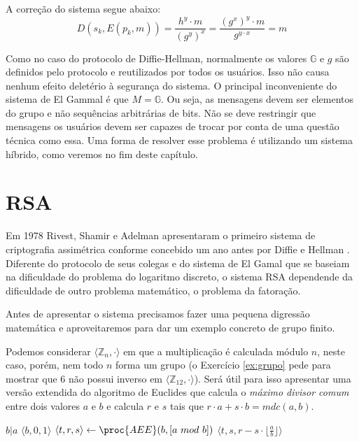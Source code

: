 A correção do sistema segue abaixo:
\begin{displaymath}
  D(s_k, E(p_k, m)) =  \frac{h^y \cdot m}{(g^y)^x} = \frac{(g^x)^y \cdot m}{g^{y \cdot x}} = m 
\end{displaymath}

Como no caso do protocolo de Diffie-Hellman, normalmente os valores $\mathbb{G}$ e $g$ são definidos pelo protocolo e reutilizados por todos os usuários.
Isso não causa nenhum efeito deletério à segurança do sistema.
O principal inconveniente do sistema de El Gammal é que $M = \mathbb{G}$.
Ou seja, as mensagens devem ser elementos do grupo e não sequências arbitrárias de bits.
Não se deve restringir que mensagens os usuários devem ser capazes de trocar por conta de uma questão técnica como essa.
Uma forma de resolver esse problema é utilizando um sistema híbrido, como veremos no fim deste capítulo.


\section{RSA}
\label{sec:rsa}

Em 1978 Rivest, Shamir e Adelman apresentaram o primeiro sistema de criptografia assimétrica conforme concebido um ano antes por Diffie e Hellman \cite{Rivest78}.
Diferente do protocolo de seus colegas e do sistema de El Gamal que se baseiam na dificuldade do problema do logaritmo discreto, o sistema RSA dependende da dificuldade de outro problema matemático, o problema da fatoração.

Antes de apresentar o sistema precisamos fazer uma pequena digressão matemática e aproveitaremos para dar um exemplo concreto de grupo finito.

Podemos considerar $\langle \mathbb{Z}_n, \cdot \rangle$ em que a multiplicação é calculada módulo $n$, neste caso, porém, nem todo $n$ forma um grupo (o Exercício \ref{ex:grupo} pede para mostrar que $6$ não possui inverso em $\langle \mathbb{Z}_{12}, \cdot \rangle$).
Será útil para isso apresentar uma versão extendida do algoritmo de Euclides que calcula o {\em máximo divisor comum} entre dois valores $a$ e $b$ e calcula $r$ e $s$ tais que $r \cdot a + s \cdot b = mdc(a,b)$.

\begin{codebox}
\li \If $b|a$
\li     \Then 
        \Return $\langle b, 0, 1 \rangle$
\li \Else $\langle t, r, s \rangle \gets \proc{AEE}(b, [a\ mod\ b])$
\li     \Return $\langle t, s, r - s \cdot \lfloor \frac{a}{b} \rfloor \rangle$
\End
\end{codebox}

